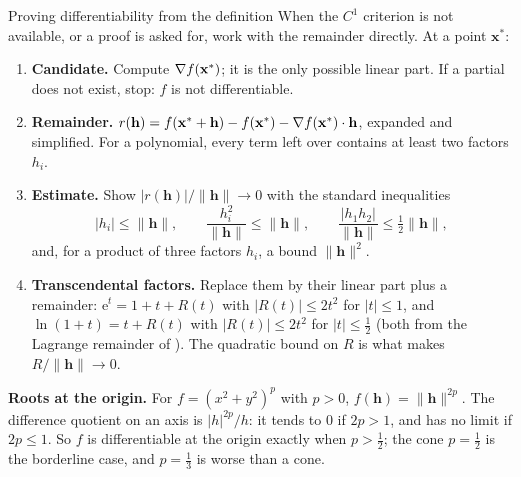 \begin{rulebox}{Proving differentiability from the definition}
When the $C^{1}$ criterion is not available, or a proof is asked for,
work with the remainder directly. At a point $\mathbf{x}^{*}$:
\begin{enumerate}[leftmargin=1.6em,itemsep=0.3ex]
  \item \textbf{Candidate.} Compute $\nabla f(\mathbf{x}^{*})$; it is the
        only possible linear part. If a partial does not exist, stop: $f$
        is not differentiable.
  \item \textbf{Remainder.}
        $r(\mathbf{h})=f(\mathbf{x}^{*}+\mathbf{h})-f(\mathbf{x}^{*})
        -\nabla f(\mathbf{x}^{*})\cdot\mathbf{h}$, expanded and simplified.
        For a polynomial, every term left over contains at least two
        factors $h_{i}$.
  \item \textbf{Estimate.} Show $|r(\mathbf{h})|/\|\mathbf{h}\|\to0$ with
        the standard inequalities
        \[
          |h_{i}|\le\|\mathbf{h}\|,\qquad
          \frac{h_{i}^{2}}{\|\mathbf{h}\|}\le\|\mathbf{h}\|,\qquad
          \frac{|h_{1}h_{2}|}{\|\mathbf{h}\|}\le\tfrac12\|\mathbf{h}\| ,
        \]
        and, for a product of three factors $h_{i}$, a bound
        $\|\mathbf{h}\|^{2}$.
  \item \textbf{Transcendental factors.} Replace them by their linear part
        plus a remainder: $\mathrm{e}^{t}=1+t+R(t)$ with $|R(t)|\le2t^{2}$
        for $|t|\le1$, and $\ln(1+t)=t+R(t)$ with $|R(t)|\le2t^{2}$ for
        $|t|\le\tfrac12$ (both from the Lagrange remainder of ).
        The quadratic bound on $R$ is what makes $R/\|\mathbf{h}\|\to0$.
\end{enumerate}
\textbf{Roots at the origin.} For $f=(x^{2}+y^{2})^{p}$ with $p>0$,
$f(\mathbf{h})=\|\mathbf{h}\|^{2p}$. The difference quotient on an axis is
$|h|^{2p}/h$: it tends to $0$ if $2p>1$, and has no limit if $2p\le1$. So
$f$ is differentiable at the origin exactly when $p>\tfrac12$; the cone
$p=\tfrac12$ is the borderline case, and $p=\tfrac13$ is worse than a cone.
\end{rulebox}

